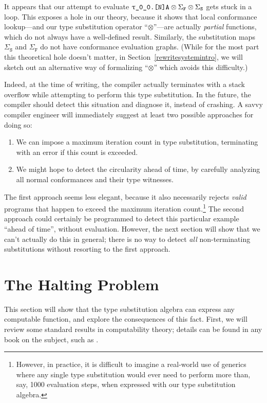\documentclass[../generics]{subfiles}
\begin{document}
It appears that our attempt to evaluate $\texttt{\texttt{$\uptau$\_0\_0}.[N]A}\otimes \Sigma_\texttt{F}\otimes\Sigma_\texttt{S}$ gets stuck in a loop. This exposes a hole in our theory, because it shows that local conformance lookup---and our type substitution operator ``$\otimes$''---are actually \emph{partial} functions, which do not always have a well-defined result. Similarly, the substitution maps $\Sigma_\texttt{S}$ and $\Sigma_\texttt{F}$ do not have conformance evaluation graphs. (While for the most part this theoretical hole doesn't matter, in Section~\ref{rewritesystemintro}, we will sketch out an alternative way of formalizing ``$\otimes$'' which avoids this difficulty.)

Indeed, at the time of writing, the compiler actually terminates with a stack overflow while attempting to perform this type substitution. In the future, the compiler should detect this situation and diagnose it, instead of crashing. A savvy compiler engineer will immediately suggest at least two possible approaches for doing so:
\begin{enumerate}
\item We can impose a maximum iteration count in type substitution, terminating with an error if this count is exceeded.
\item We might hope to detect the circularity ahead of time, by carefully analyzing all normal conformances and their type witnesses.
\end{enumerate}
The first approach seems less elegant, because it also necessarily rejects \emph{valid} programs that happen to exceed the maximum iteration count.\footnote{However, in practice, it is difficult to imagine a real-world use of generics where any single type substitution would ever need to perform more than, say, 1000 evaluation steps, when expressed with our type substitution algebra.} The second approach could certainly be programmed to detect this particular example ``ahead of time'', without evaluation. However, the next section will show that we can't actually do this in general; there is no way to detect \emph{all} non-terminating substitutions without resorting to the first approach.

\section{The Halting Problem}\label{tag systems}

This section will show that the type substitution algebra can express any computable function, and explore the consequences of this fact. First, we will review some standard results in computability theory; details can be found in any book on the subject, such as \cite{cutland}.
\end{document}
